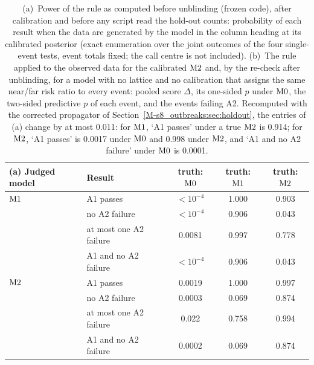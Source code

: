 \begin{table}[tbp]
  \centering\footnotesize
  \caption{(a)~Power of the rule as computed before unblinding (frozen code), after calibration and before
  any script read the hold-out counts:
  probability of each result when the data are generated by the model in the column heading at its calibrated
  posterior (exact enumeration over the joint outcomes of the four single-event tests, event totals fixed; the
  call centre is not included). (b)~The rule applied to the observed data for the calibrated $\mathrm{M2}$ and, by
  the re-check after unblinding, for a model with no lattice and no calibration that assigns the same
  near/far risk ratio to every event: pooled score $\Delta$, its one-sided $p$ under $\mathrm{M0}$, the two-sided
  predictive $p$ of each event, and the events failing A2. Recomputed with the corrected propagator of
  Section~\ref{M-s8_outbreaks:sec:holdout}, the entries of (a) change by at most 0.011: for $\mathrm{M1}$, `A1 passes'
  under a true $\mathrm{M2}$ is 0.914; for $\mathrm{M2}$, `A1 passes' is 0.0017 under $\mathrm{M0}$ and 0.998 under $\mathrm{M2}$, and
  `A1 and no A2 failure' under $\mathrm{M0}$ is 0.0001.}
  \label{appC_protocol:tab:power}
  \begin{tabular}{@{}llccc@{}}
    \toprule
    (a) Judged model & Result & truth: $\mathrm{M0}$ & truth: $\mathrm{M1}$ & truth: $\mathrm{M2}$ \\
    \midrule
    $\mathrm{M1}$ & A1 passes & $<10^{-4}$ & 1.000 & 0.903 \\
     & no A2 failure & $<10^{-4}$ & 0.906 & 0.043 \\
     & at most one A2 failure & 0.0081 & 0.997 & 0.778 \\
     & A1 and no A2 failure & $<10^{-4}$ & 0.906 & 0.043 \\
    \addlinespace
    $\mathrm{M2}$ & A1 passes & 0.0019 & 1.000 & 0.997 \\
     & no A2 failure & 0.0003 & 0.069 & 0.874 \\
     & at most one A2 failure & 0.022 & 0.758 & 0.994 \\
     & A1 and no A2 failure & 0.0002 & 0.069 & 0.874 \\
    \bottomrule
  \end{tabular}


\end{table}
